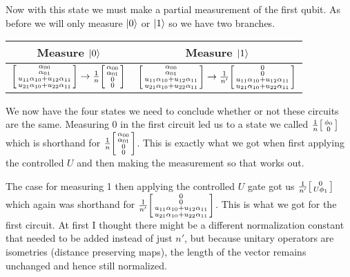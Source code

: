 \documentclass[boxes,pages]{homework}
\begin{document}
\begin{solution}
\begin{equation*}
	\end{equation*}
	Now with this state we must make a partial measurement of the first qubit. As before we will only measure $\ket{0}$ or $\ket{1}$ so we have two branches.
	\begin{center}
		\begin{tabular}{c@{\hskip 0.5in} c}
			Measure $\ket{0}$ & Measure $\ket{1}$ \\ \toprule
			$\smqty[\alpha_{00} \\ \alpha_{01} \\ u_{11}\alpha_{10} + u_{12}\alpha_{11} \\ u_{21}\alpha_{10} + u_{22}\alpha_{11}] \to \frac{1}{n}\smqty[\alpha_{00} \\ \alpha_{01} \\ 0 \\ 0]$ & $\smqty[\alpha_{00} \\ \alpha_{01} \\ u_{11}\alpha_{10} + u_{12}\alpha_{11} \\ u_{21}\alpha_{10} + u_{22}\alpha_{11}] \to \frac{1}{n'}\smqty[0 \\ 0 \\ u_{11}\alpha_{10} + u_{12}\alpha_{11} \\ u_{21}\alpha_{10} + u_{22}\alpha_{11}]$
		\end{tabular}
	\end{center}
	We now have the four states we need to conclude whether or not these circuits are the same. Measuring 0 in the first circuit led us to a state we called $\frac{1}{n}\smqty[\phi_0 \\ 0]$ which is shorthand for $\frac{1}{n}\smqty[\alpha_{00} \\ \alpha_{01} \\ 0 \\ 0]$. This is exactly what we got when first applying the controlled $U$ and then making the measurement so that works out.

	The case for measuring 1 then applying the controlled $U$ gate got us $\frac{1}{n'}\smqty[0 \\ U\phi_1]$ which again was shorthand for $\frac{1}{n'}\smqty[0 \\ 0 \\ u_{11}\alpha_{10} + u_{12}\alpha_{11} \\ u_{21}\alpha_{10} + u_{22}\alpha_{11}]$. This is what we got for the first circuit. At first I thought there might be a different normalization constant that needed to be added instead of just $n'$, but because unitary operators are isometries (distance preserving maps), the length of the vector remains unchanged and hence still normalized.
\end{solution}
\end{document}

